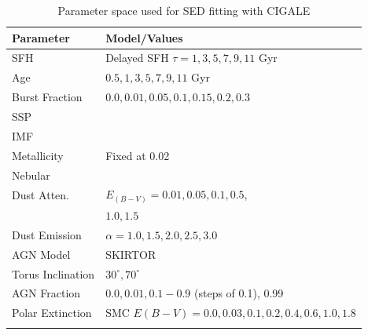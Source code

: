 \begin{table}[htbp]
    \caption{Parameter space used for SED fitting with CIGALE}
    \label{tab:parameter_space}
    \begin{center}
    \begin{tabular}{ll}
        \toprule
        \textbf{Parameter} & \textbf{Model/Values} \\ 
        \hline
        SFH                 & Delayed SFH $\tau = 1,3,5,7,9,11$ Gyr \\
        Age                 & $0.5, 1, 3, 5, 7, 9, 11$ Gyr \\
        Burst Fraction      & $0.0, 0.01, 0.05, 0.1, 0.15, 0.2, 0.3$ \\
        SSP                 & \cite{bruzual_stellar_2003} \\
        IMF                 & \cite{chabrier_galactic_2003} \\
        Metallicity         & Fixed at 0.02 \\
        Nebular             & \cite{inoue_rest-frame_2011} \\
        Dust Atten.         & \cite{calzetti_dust_2000} $E_{(B-V)} = 0.01, 0.05, 0.1, 0.5$, \\
                            & $1.0, 1.5$ \\
        Dust Emission       & \cite{dale_two-parameter_2014} $\alpha = 1.0, 1.5, 2.0, 2.5, 3.0$ \\
        AGN Model           & SKIRTOR \citep{stalevski_3d_2012, stalevski_dust_2016} \\
        Torus Inclination   & $30^\circ, 70^\circ$ \\
        AGN Fraction        & $0.0, 0.01, 0.1 - 0.9$ (steps of 0.1), 0.99 \\
        Polar Extinction    & SMC $E(B-V) = 0.0, 0.03, 0.1, 0.2, 0.4, 0.6, 1.0, 1.8$ \\
        \botrule
    \end{tabular}
    \end{center}
\end{table}


